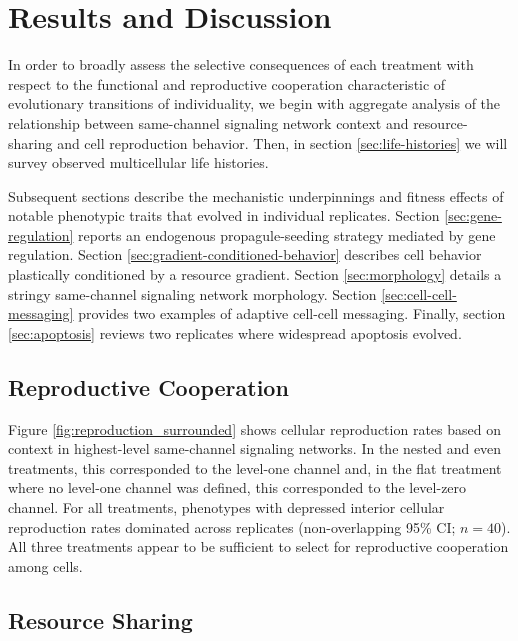 \section{Results and Discussion}

In order to broadly assess the selective consequences of each treatment with respect to the functional and reproductive cooperation characteristic of evolutionary transitions of individuality, we begin with aggregate analysis of the relationship between same-channel signaling network context and resource-sharing and cell reproduction behavior.
Then, in section \ref{sec:life-histories} we will survey observed multicellular life histories.

Subsequent sections describe the mechanistic underpinnings and fitness effects of notable phenotypic traits that evolved in individual replicates.
Section \ref{sec:gene-regulation} reports an endogenous propagule-seeding strategy mediated by gene regulation.
Section \ref{sec:gradient-conditioned-behavior} describes cell behavior plastically conditioned by a resource gradient.
Section \ref{sec:morphology} details a stringy same-channel signaling network morphology.
Section \ref{sec:cell-cell-messaging} provides two examples of adaptive cell-cell messaging.
Finally, section \ref{sec:apoptosis} reviews two replicates where widespread apoptosis evolved.

\subsection{Reproductive Cooperation} \label{sec:reproductive-cooperation}



Figure \ref{fig:reproduction_surrounded} shows cellular reproduction rates based on context in highest-level same-channel signaling networks.
In the nested and even treatments, this corresponded to the level-one channel and, in the flat treatment where no level-one channel was defined, this corresponded to the level-zero channel.
For all treatments, phenotypes with depressed interior cellular reproduction rates dominated across replicates (non-overlapping 95\% CI; $n=40$).
All three treatments appear to be sufficient to select for reproductive cooperation among cells.

\subsection{Resource Sharing} \label{sec:resource-sharing}

